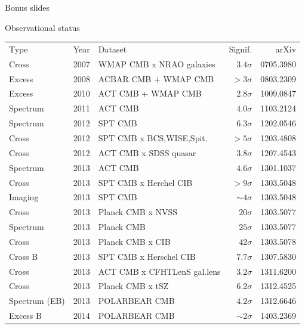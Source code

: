 \documentclass[table]{beamer}
\begin{document}
\begin{frame}{Bonus slides}
\end{frame}

\begin{frame}{Observational status}
	\small
	\begin{tabular}{lrlrr}
		Type & Year & Dataset & Signif. &arXiv \\
		\rowcolor{red!25}   Cross     & 2007 &WMAP CMB x NRAO galaxies& $3.4\sigma$ &0705.3980  \\
		\rowcolor{green!25} Excess    & 2008 &ACBAR CMB + WMAP CMB    &  $>3\sigma$ &0803.2309  \\
		\rowcolor{green!25} Excess    & 2010 &ACT CMB + WMAP CMB      & $2.8\sigma$ &1009.0847  \\
		\rowcolor{blue!25}  Spectrum  & 2011 &ACT CMB                 & $4.0\sigma$ &1103.2124  \\
		\rowcolor{blue!25}  Spectrum  & 2012 &SPT CMB                 & $6.3\sigma$ &1202.0546  \\
		\rowcolor{red!25}   Cross     & 2012 &SPT CMB x BCS,WISE,Spit.&  $>5\sigma$ &1203.4808  \\
		\rowcolor{red!25}   Cross     & 2012 &ACT CMB x SDSS quasar   & $3.8\sigma$ &1207.4543  \\
		\rowcolor{blue!25}  Spectrum  & 2013 &ACT CMB                 & $4.6\sigma$ &1301.1037  \\
		\rowcolor{red!25}   Cross     & 2013 &SPT CMB x Herchel CIB   &  $>9\sigma$ &1303.5048  \\
		\rowcolor{yellow!25}Imaging   & 2013 &SPT CMB                &$\sim4\sigma$ &1303.5048  \\
		\rowcolor{red!25}   Cross     & 2013 &Planck CMB x NVSS       &  $20\sigma$ &1303.5077  \\
		\rowcolor{blue!25}  Spectrum  & 2013 &Planck CMB              &  $25\sigma$ &1303.5077  \\
		\rowcolor{red!25}   Cross     & 2013 &Planck CMB x CIB        &  $42\sigma$ &1303.5078  \\
		\rowcolor{orange!25}Cross B   & 2013 &SPT CMB x Herschel CIB  & $7.7\sigma$ &1307.5830  \\
		\rowcolor{red!25}   Cross     & 2013 &ACT CMB x CFHTLenS gal.lens& $3.2\sigma$ &1311.6200  \\
		\rowcolor{red!25}   Cross     & 2013 &Planck CMB x tSZ        & $6.2\sigma$ &1312.4525  \\
		\rowcolor{blue!25}  Spectrum (EB) & 2013 &POLARBEAR CMB           & $4.2\sigma$ &1312.6646  \\
		\rowcolor{green!25}  Excess B  & 2014 &POLARBEAR CMB          &$\sim2\sigma$ &1403.2369
	\end{tabular}
\end{frame}
\end{document}
